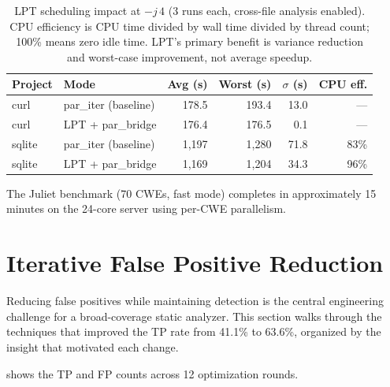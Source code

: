 \documentclass[10pt,twocolumn,letterpaper]{article}
\begin{document}
\begin{table}[t]
\centering
\footnotesize
\begin{tabular}{@{}llrrrr@{}}
\toprule
\textbf{Project} & \textbf{Mode} & \textbf{Avg (s)} & \textbf{Worst (s)} & \textbf{$\sigma$ (s)} & \textbf{CPU eff.} \\
\midrule
curl    & par\_iter (baseline) & 178.5 & 193.4 & 13.0 & --- \\
curl    & LPT + par\_bridge   & 176.4 & 176.5 &  0.1 & --- \\
\addlinespace
sqlite  & par\_iter (baseline) & 1{,}197 & 1{,}280 & 71.8 & 83\% \\
sqlite  & LPT + par\_bridge   & 1{,}169 & 1{,}204 & 34.3 & 96\% \\
\bottomrule
\end{tabular}
\caption{LPT scheduling impact at $-j\,4$ (3 runs each, cross-file
analysis enabled).  CPU efficiency is CPU time divided by wall time
divided by thread count; 100\% means zero idle time.  LPT's primary
benefit is variance reduction and worst-case improvement, not average
speedup.}
\label{tab:parallel}
\end{table}

The Juliet benchmark (70 CWEs, fast mode) completes in approximately
15 minutes on the 24-core server using per-CWE parallelism.

\section{Iterative False Positive Reduction}
\label{sec:fp-reduction}

Reducing false positives while maintaining detection is the central
engineering challenge for a broad-coverage static analyzer.  This
section walks through the techniques that improved the TP rate from
41.1\% to 63.6\%, organized by the insight that motivated each change.

 shows the TP and FP counts across 12
optimization rounds.
\end{document}
